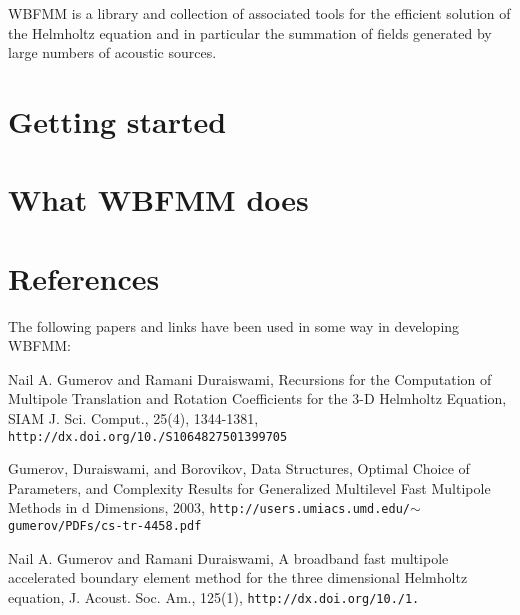 W\+B\+F\+M\+M is a library and collection of associated tools for the efficient solution of the Helmholtz equation and in particular the summation of fields generated by large numbers of acoustic sources.\section{Getting started}\label{index_start}
\section{What W\+B\+F\+M\+M does}\label{index_what}
\section{References}\label{index_references}
The following papers and links have been used in some way in developing W\+B\+F\+M\+M\+:


\begin{DoxyEnumerate}
\item Nail A. Gumerov and Ramani Duraiswami, Recursions for the Computation of Multipole Translation and Rotation Coefficients for the 3-\/\+D Helmholtz Equation, S\+I\+A\+M J. Sci. Comput., 25(4), 1344-\/1381, {\tt http\+://dx.\+doi.\+org/10./\+S1064827501399705}
\item Gumerov, Duraiswami, and Borovikov, Data Structures, Optimal Choice of Parameters, and Complexity Results for Generalized Multilevel Fast Multipole Methods in d Dimensions, 2003, {\tt http\+://users.\+umiacs.\+umd.\+edu/$\sim$gumerov/\+P\+D\+Fs/cs-\/tr-\/4458.\+pdf}
\item Nail A. Gumerov and Ramani Duraiswami, A broadband fast multipole accelerated boundary element method for the three dimensional Helmholtz equation, J. Acoust. Soc. Am., 125(1), {\tt http\+://dx.\+doi.\+org/10./1.} 
\end{DoxyEnumerate}